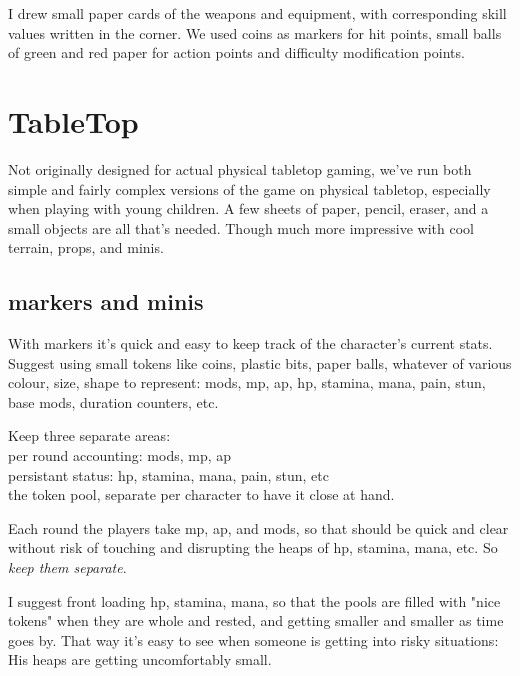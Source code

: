 I drew small paper cards of the weapons and equipment, with corresponding skill values written in the corner. We used coins as markers for hit points, small balls of green and red paper for action points and difficulty modification points.









\section*{TableTop}
Not originally designed for actual physical tabletop gaming, we've run both simple and fairly complex versions of the game on physical tabletop, especially when playing with young children.
A few sheets of paper, pencil, eraser, and a small objects are all that's needed. Though much more impressive with cool terrain, props, and minis.


\subsection*{markers and minis}
With markers it's quick and easy to keep track of the character's current stats. Suggest using small tokens like coins, plastic bits, paper balls, whatever of various colour, size, shape to represent: mods, mp, ap, hp, stamina, mana, pain, stun, base mods, duration counters, etc.

Keep three separate areas:\\
per round accounting: mods, mp, ap\\
persistant status: hp, stamina, mana, pain, stun, etc\\
the token pool, separate per character to have it close at hand.

Each round the players take mp, ap, and mods, so that should be quick and clear without risk of touching and disrupting the heaps of hp, stamina, mana, etc. So \emph{keep them separate}.

I suggest front loading hp, stamina, mana, so that the pools are filled with "nice tokens" when they are whole and rested, and getting smaller and smaller as time goes by. That way it's easy to see when someone is getting into risky situations: His heaps are getting uncomfortably small.


